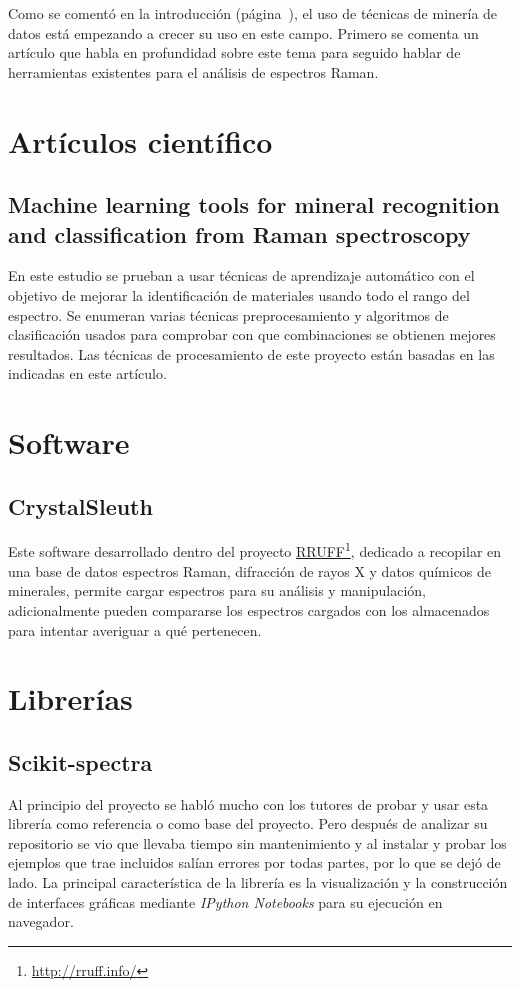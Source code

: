 
Como se comentó en la introducción (página~\pageref{ch:introduccion}), el uso de
técnicas de minería de datos está empezando a crecer su uso en este campo.
Primero se comenta un artículo que habla en profundidad sobre este tema para
seguido hablar de herramientas existentes para el análisis de espectros Raman.

\section{Artículos científico}

\subsection{Machine learning tools for mineral recognition	and classification
	from Raman spectroscopy\cite{art:raman-carey}}\label{sec:carey}
En este estudio se prueban a usar técnicas de aprendizaje automático con el
objetivo de mejorar la identificación de materiales usando todo el rango del
espectro. Se enumeran varias técnicas preprocesamiento y algoritmos de
clasificación usados para comprobar con que combinaciones se obtienen mejores
resultados. Las técnicas de procesamiento de este proyecto están basadas en las
indicadas en este artículo.

\section{Software}

\subsection{CrystalSleuth}
Este software desarrollado dentro del proyecto 
\href{http://rruff.info/}{RRUFF}\footnote{\url{http://rruff.info/}}, dedicado a
recopilar en una base de datos espectros Raman, difracción de rayos X y datos
químicos de minerales, permite cargar espectros para su análisis y manipulación,
adicionalmente pueden compararse los espectros cargados con los almacenados para
intentar averiguar a qué pertenecen.

\section{Librerías}

\subsection{Scikit-spectra}
Al principio del proyecto se habló mucho con los tutores de probar y usar esta
librería como referencia o como base del proyecto. Pero después de analizar su
repositorio se vio que llevaba tiempo sin mantenimiento y al instalar y probar
los ejemplos que trae incluidos salían errores por todas partes, por lo que se
dejó de lado. La principal característica de la librería es la visualización y
la construcción de interfaces gráficas mediante \textit{IPython Notebooks} para
su ejecución en navegador\cite{art:skspec}.

